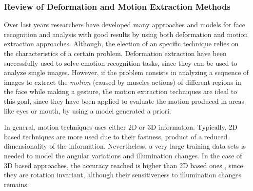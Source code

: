 \subsubsection{Review of Deformation and Motion Extraction Methods}
Over last years researchers have developed many approaches and models for face recognition and analysis with good results by using both deformation and motion extraction approaches. Although, the election of an specific technique relies on the characteristics of a certain problem. Deformation extraction have been successfully used to solve emotion recognition tasks, since they can be used to analyze single images. However, if the problem consists in analyzing a sequence of images to extract the \emph{motion} (caused by muscles actions) of different regions in the face while making a gesture, the motion extraction techniques are ideal to this goal, since they have been applied to evaluate the motion produced in areas like eyes or mouth, by using a model generated a priori.

In general, motion techniques uses either 2D or 3D information. Typically, 2D based techniques are more used due to their fastness, product of a reduced dimensionality of the information. Nevertheless,  a very large training data sets is needed to model the angular variations and illumination changes. In the case of 3D based approaches, the accuracy reached is higher than 2D based ones \cite{Fang2012}, since they are rotation invariant, although their sensitiveness to illumination changes remains.%

